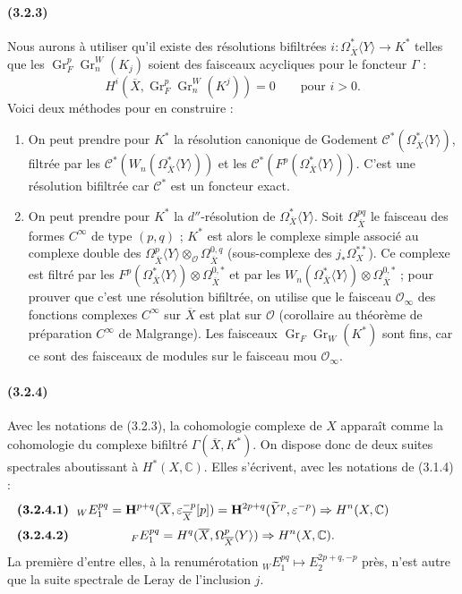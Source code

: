\documentclass[10pt]{article}
\newcommand{\C}{\mathbb C}
\newcommand{\Gr}{\operatorname{Gr}}
\begin{document}
\paragraph{(3.2.3)} Nous aurons à utiliser qu'il existe des résolutions bifiltrées $i:\Omega_{\overline X}^{*}\langle Y\rangle\longrightarrow K^*$ telles que les $\Gr_F^p\Gr_n^W(K_j)$ soient des faisceaux acycliques pour le foncteur $\Gamma$ :
\[
H^i(\overline X,\Gr_F^p\Gr_n^W(K^j))=0\qquad \text{pour }i>0.
\]
Voici deux méthodes pour en construire :
\begin{enumerate}[label=\textit{\alph*)}]
\item On peut prendre pour $K^*$ la résolution canonique de Godement $\mathcal C^*(\Omega_{\overline X}^{*}\langle Y\rangle)$, filtrée par les $\mathcal C^*(W_n(\Omega_{\overline X}^{*}\langle Y\rangle))$ et les $\mathcal C^*(F^p(\Omega_{\overline X}^{*}\langle Y\rangle))$. C'est une résolution bifiltrée car $\mathcal C^*$ est un foncteur exact.
\item On peut prendre pour $K^*$ la $d''$-résolution de $\Omega_{\overline X}^{*}\langle Y\rangle$. Soit $\Omega_{\overline X}^{pq}$ le faisceau des formes $C^\infty$ de type $(p,q)$ ; $K^*$ est alors le complexe simple associé au complexe double des $\Omega_{\overline X}^{p}\langle Y\rangle\otimes_{\mathcal O}\Omega_{\overline X}^{0,q}$ (sous-complexe des $j_*\Omega_X^{**}$). Ce complexe est filtré par les $F^p(\Omega_{\overline X}^{*}\langle Y\rangle)\otimes\Omega_{\overline X}^{0,*}$ et par les $W_n(\Omega_{\overline X}^{*}\langle Y\rangle)\otimes\Omega_{\overline X}^{0,*}$ ; pour prouver que c'est une résolution bifiltrée, on utilise que le faisceau $\mathcal O_\infty$ des fonctions complexes $C^\infty$ sur $\overline X$ est plat sur $\mathcal O$ (corollaire au théorème de préparation $C^\infty$ de Malgrange). Les faisceaux $\Gr_F\Gr_W(K^*)$ sont fins, car ce sont des faisceaux de modules sur le faisceau mou $\mathcal O_\infty$.
\end{enumerate}

\paragraph{(3.2.4)} Avec les notations de (3.2.3), la cohomologie complexe de $X$ apparaît comme la cohomologie du complexe bifiltré $\Gamma(\overline X,K^*)$. On dispose donc de deux suites spectrales aboutissant à $H^*(X,\C)$. Elles s'écrivent, avec les notations de (3.1.4) :
\[
\makebox[\textwidth][s]{\textbf{(3.2.4.1)}\hfill$\displaystyle {}_W E_1^{pq}=\mathbf H^{p+q}(\overline X,\varepsilon_{\overline X}^{-p}[p])=\mathbf H^{2p+q}(\widetilde Y^p,\varepsilon^{-p})\Rightarrow H^n(X,\C)$\hfill\phantom{\textbf{(3.2.4.1)}}}
\]
\[
\makebox[\textwidth][s]{\textbf{(3.2.4.2)}\hfill$\displaystyle {}_F E_1^{pq}=H^q(\overline X,\Omega_{\overline X}^p\langle Y\rangle)\Rightarrow H^n(X,\C).$\hfill\phantom{\textbf{(3.2.4.2)}}}
\]
La première d'entre elles, à la renumérotation ${}_W E_1^{pq}\mapsto E_2^{2p+q,-p}$ près, n'est autre que la suite spectrale de Leray de l'inclusion $j$.
\end{document}
